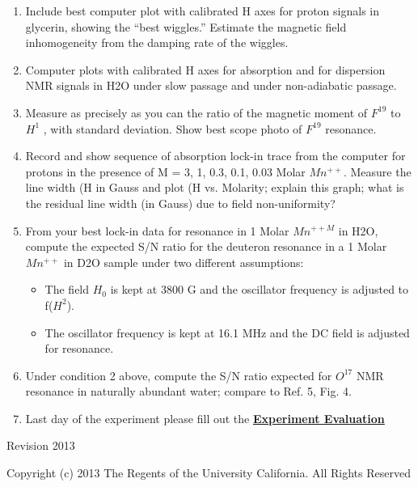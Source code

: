 \documentclass{../lab}
\begin{document}
\begin{enumerate}
    \item Include best computer plot with calibrated H axes for proton signals in glycerin, showing the ``best wiggles.'' Estimate the magnetic field inhomogeneity from the damping rate of the wiggles.

    \item Computer plots with calibrated H axes for absorption and for dispersion NMR signals in H2O under slow passage and under non-adiabatic passage.

    \item Measure as precisely as you can the ratio of the magnetic moment of $ F^{19}$ to $H^1$ , with standard deviation. Show best scope photo of $F^{19}$  resonance.

    \item Record and show sequence of absorption lock-in trace from the computer for protons in the presence of M = 3, 1, 0.3, 0.1, 0.03 Molar $Mn^{++}$. Measure the line width (H in Gauss and plot (H vs. Molarity; explain this graph; what is the residual line width (in Gauss) due to field non-uniformity?

    \item From your best lock-in data for resonance in 1 Molar $Mn^{++M}$ in H2O, compute the expected S/N ratio for the deuteron resonance in a 1 Molar $Mn^{++}$ in D2O sample under two different assumptions:

    \begin{itemize}
        \item The field $H_0$  is kept at 3800 G and the oscillator frequency is adjusted to f($H^2$).

        \item The oscillator frequency is kept at 16.1 MHz and the DC field is adjusted for resonance.

    \end{itemize}

    \item Under condition 2 above, compute the S/N ratio expected for $O^{17}$  NMR resonance in naturally abundant water; compare to Ref. 5, Fig. 4.

    \item Last day of the experiment please fill out the \href{\ExperimentEvaluation}{\textbf{Experiment Evaluation}}

\end{enumerate}

Revision 2013

Copyright (c) 2013 The Regents of the University California. All Rights Reserved
\end{document}

